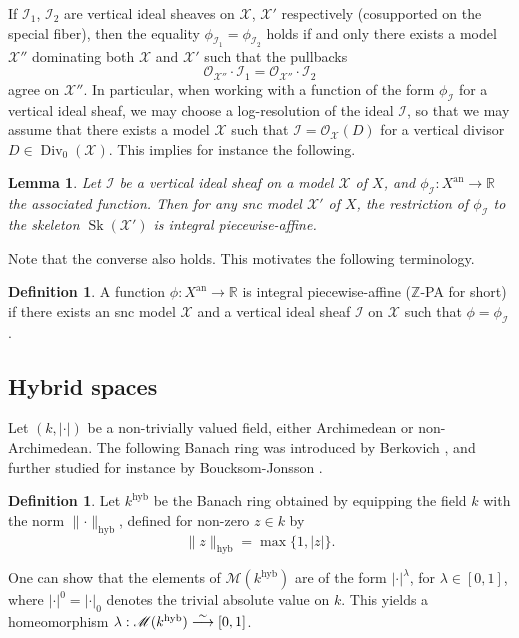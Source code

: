 \documentclass[JEP,XML,SOM,Unicode,published]{cedram}
\newcommand{\To}[1]{\mathchoice{\xrightarrow{\textstyle\kern4pt#1\kern3pt}}{\stackrel{#1}{\longrightarrow}}{}{}}
\newtheorem{lem}[equation]{Lemma}
\theoremstyle{definition}
\newtheorem{defn}[equation]{Definition}
\newcommand \R{\mathbb R}
\newcommand \Z{\mathbb Z}
\newcommand \gO {\mathcal O}
\newcommand \M {\mathscr {M}}
\newcommand \X {\mathscr{X}}
\newcommand{\an}{\mathrm{an}}
\DeclareMathOperator \Div {Div}
\newcommand{\hyb}{\mathrm{hyb}}
\DeclareMathOperator{\Sk}{Sk}
\begin{document}
If $\mathscr{I}_1$, $\mathscr{I}_2$ are vertical ideal sheaves on $\X$, $\X'$ respectively (\ie cosupported on the special fiber), then the equality $\phi_{\mathscr{I}_1} = \phi_{\mathscr{I}_2}$ holds if and only there exists a model~$\X''$ dominating both $\X$ and $\X'$ such that the pullbacks
\[
\gO_{\X''} \cdot \mathscr{I}_1 = \gO_{\X''}\cdot \mathscr{I}_2
\]
agree on $\X''$. In particular, when working with a function of the form $\phi_{\mathscr{I}}$ for a vertical ideal sheaf, we may choose a log-resolution of the ideal $\mathscr{I}$, so that we may assume that there exists a model $\X$ such that $\mathscr{I} = \gO_{\X}(D)$ for a vertical divisor $D \in \Div_0(\X)$. This implies for instance the following.\begin{lem} Let $\mathscr{I}$ be a vertical ideal sheaf on a model $\X$ of $X$, and $\phi_{\mathscr{I}}: X^{\an} \to \R$ the associated function. Then for any snc model $\X'$ of $X$, the restriction of $\phi_{\mathscr{I}}$ to the skeleton $\Sk(\X')$ is integral piecewise-affine.
\end{lem}
Note that the converse also holds. This motivates the following terminology.
\begin{defn} \label{def model f}
A function $\phi: X^{\an} \to \R$ is integral piecewise-affine ($\Z$-PA for short) if there exists an snc model $\X$ and a vertical ideal sheaf $\mathscr{I}$ on $\X$ such that $\phi = \phi_{\mathscr{I}}$.
\end{defn}
\subsection{Hybrid spaces} \label{sec hyb}
Let $(k, \lvert \cdot \rvert)$ be a non-trivially valued field, either Archimedean or non-Archimedean. The following Banach ring was introduced by Berkovich \cite{Ber3}, and further studied for instance by Boucksom-Jonsson \cite[App.\,A]{BJ}.
\begin{defn}
Let $k^{\hyb}$ be the Banach ring obtained by equipping the field $k$ with the norm $\lVert \cdot \rVert_{\hyb}$, defined for non-zero $z \in k$ by
\[
\lVert z \rVert_{\hyb} = \max \{ 1 , \lvert z \rvert \}.
\]
\end{defn}
One can show \cite[Ex.\,1.1.15]{LP} that the elements of $\M(k^{\hyb})$ are of the form $\lvert \cdot \rvert^{\lambda}$, for $\lambda \in [0,1]$, where $\lvert \cdot \rvert^0 = \lvert \cdot \rvert_0$ denotes the trivial absolute value on $k$. This yields a homeomorphism $\lambda: \M(k^{\hyb}) \To{\sim} [0,1]$.
\end{document}
